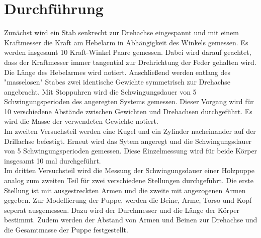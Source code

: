 \section{Durchführung}
\label{sec:Durchführung}

Zunächst wird ein Stab senkrecht zur Drehachse eingespannt und 
mit einem Kraftmesser die Kraft am Hebelarm in Abhängigkeit des 
Winkels gemessen. Es werden insgesamt 10 Kraft-Winkel Paare 
gemessen. Dabei wird darauf geachtet, dass der Kraftmesser immer
tangential zur Drehrichtung der Feder gehalten wird. Die Länge 
des Hebelarmes wird notiert. 
Anschließend werden entlang des "masselosen" Stabes zwei identische
Gewichte symmetrisch zur Drehachse angebracht. Mit Stoppuhren 
wird die Schwingungsdauer von 5 Schwingungsperioden des angeregten
Systems gemessen. Dieser Vorgang wird für 10 verschiedene Abstände 
zwischen Gewichten und Drehachsen durchgeführt. Es wird die Masse 
der verwendeten Gewichte notiert. \\
\newline
Im zweiten Versuchsteil werden eine Kugel und ein Zylinder nacheinander 
auf der Drillachse befestigt. Erneut wird das Sytem angeregt 
und die Schwingungsdauer von 5 Schwingungsperioden gemessen. 
Diese Einzelmessung wird für beide Körper insgesamt 10 mal durchgeführt.\\
\newline
Im dritten Versuchsteil wird die Messung der Schwingungsdauer einer 
Holzpuppe analog zum zweiten Teil für zwei verschiedene Stellungen 
durchgeführt. Die erste Stellung ist mit ausgestreckten Armen und die
zweite mit angezogenen Armen gegeben. Zur Modellierung 
der Puppe, werden die Beine, Arme, Torso und Kopf seperat ausgemessen. 
Dazu wird der Durchmesser und die Länge der Körper bestimmt. Zudem 
werden der Abstand von Armen und Beinen zur Drehachse und die 
Gesamtmasse der Puppe festgestellt. 